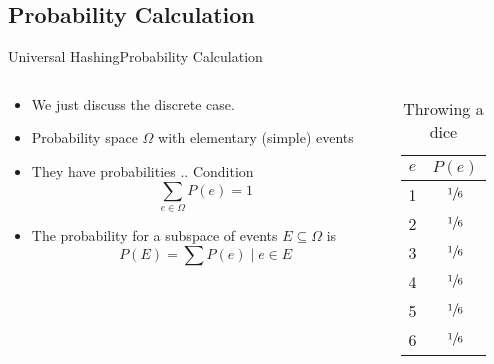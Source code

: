 \subsection{Probability Calculation}

\begin{frame}{Universal Hashing}{Probability Calculation}
  \begin{columns}
    \begin{column}{0.65\textwidth}
      \begin{itemize}
        \item<2->
          We just discuss the discrete case.
        \item<3->
          Probability space {\color{Mittel-Blau}$\Omega$} with {\color{Mittel-Blau}elementary (simple) events}
        \item
          They have probabilities .. Condition  {\color{Mittel-Blau}\[\sum_{e \in \Omega} P(e) = 1\]}
        \item
          The probability for a subspace of events {\color{Mittel-Blau}$E \subseteq \Omega$} is
          {\color{Mittel-Blau}\[P(E) = \sum P(e) \mid e \in E\]}
      \end{itemize}
    \end{column}
    \begin{column}{0.35\textwidth}
      \begin{table}[!h]
        \caption{Throwing a dice}
        \label{tab:probabilities:rolling_dice}
        \begin{tabularx}{0.5\linewidth}{c|c}
          {\color{Mittel-Blau}$e$} & {\color{Mittel-Blau}$P(e)$}\\
          \midrule
          1 & $\sfrac{1}{6}$\\
          2 & $\sfrac{1}{6}$\\
          3 & $\sfrac{1}{6}$\\
          4 & $\sfrac{1}{6}$\\
          5 & $\sfrac{1}{6}$\\
          6 & $\sfrac{1}{6}$\\
        \end{tabularx}
      \end{table}
    \end{column}
  \end{columns}
\end{frame}


